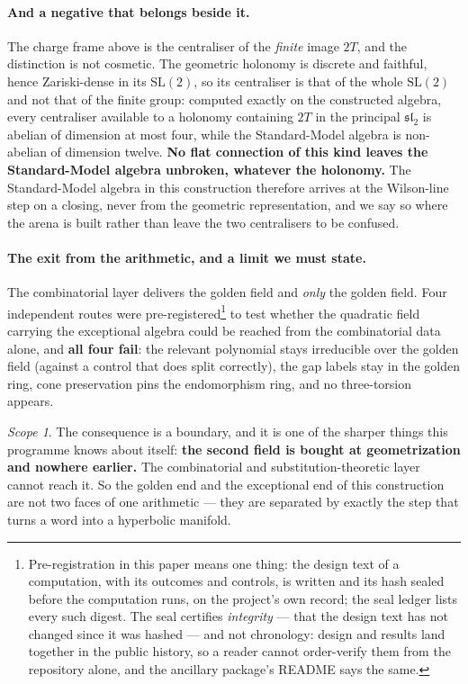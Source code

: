 \documentclass[11pt,a4paper]{article}
\theoremstyle{definition}
\theoremstyle{remark}
\newtheorem{scopenote}{Scope}
\begin{document}
\paragraph{And a negative that belongs beside it.} The charge frame above is the centraliser of the
\emph{finite} image $2T$, and the distinction is not cosmetic. The geometric holonomy is discrete and faithful, hence
Zariski-dense in its $\mathrm{SL}(2)$, so its centraliser is that of the whole $\mathrm{SL}(2)$ and not that of the finite
group: computed exactly on the constructed algebra, every centraliser available to a holonomy containing $2T$ in the
principal $\mathfrak{sl}_2$ is abelian of dimension at most four, while the Standard-Model algebra is non-abelian of
dimension twelve. \textbf{No flat connection of this kind leaves the Standard-Model algebra unbroken, whatever the
holonomy.} The Standard-Model algebra in this construction therefore arrives at the Wilson-line step on a closing, never
from the geometric representation, and we say so where the arena is built rather than leave the two centralisers to be
confused.

\paragraph{The exit from the arithmetic, and a limit we must state.} The combinatorial layer
delivers the golden field and \emph{only} the golden field. Four independent routes were
pre-registered\footnote{Pre-registration in this paper means one thing: the design text of a computation, with its outcomes and controls, is written and its hash sealed before the computation runs, on the project's own record; the seal ledger lists every such digest. The seal certifies \emph{integrity} --- that the design text has not changed since it was hashed --- and not chronology: design and results land together in the public history, so a reader cannot order-verify them from the repository alone, and the ancillary package's README says the same.} to test whether the quadratic field carrying the exceptional algebra could be reached
from the combinatorial data alone, and \textbf{all four fail}: the relevant polynomial stays
irreducible over the golden field (against a control that does split correctly), the gap labels stay
in the golden ring, cone preservation pins the endomorphism ring, and no three-torsion appears.

\begin{scopenote}
The consequence is a boundary, and it is one of the sharper things this programme knows about
itself: \textbf{the second field is bought at geometrization and nowhere earlier.} The combinatorial
and substitution-theoretic layer cannot reach it. So the golden end and the exceptional end of this
construction are not two faces of one arithmetic --- they are separated by exactly the step that
turns a word into a hyperbolic manifold.
\end{scopenote}
\end{document}
